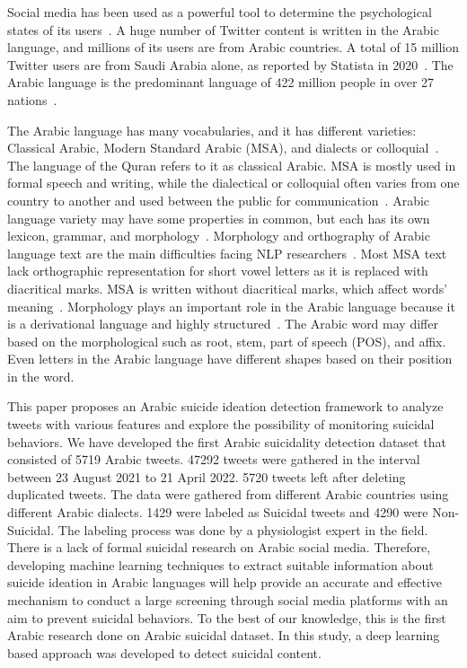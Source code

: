 \documentclass[11pt]{article}
\begin{document}
Social media has been used as a powerful tool to determine the psychological states of its users~\cite{15n10.1145/2858036.2858207}. A huge number of Twitter content is written in the Arabic language, and millions of its users are from Arabic countries. A total of 15 million Twitter users are from Saudi Arabia alone, as reported by Statista in 2020~\cite{16nhttps://doi.org/10.48550/arxiv.2004.04315}. The Arabic language is the predominant language of 422 million people in over 27 nations~\cite{17nBOUDAD20182479}.

The  Arabic language has many vocabularies, and it has different varieties: Classical Arabic, Modern Standard Arabic (MSA), and dialects or colloquial~\cite{17nBOUDAD20182479,18n10.1145/1644879.1644881}. The language of the Quran refers to it as classical Arabic. MSA is mostly used in formal speech and writing, while the dialectical or colloquial often varies from one country to another and used between the public for communication~\cite{17nBOUDAD20182479}. Arabic language variety may have some properties in common, but each has its own lexicon, grammar, and morphology~\cite{18n10.1145/1644879.1644881}. Morphology and orthography of Arabic language text are the main difficulties facing NLP researchers~\cite{17nBOUDAD20182479,19n7945623}. Most MSA text lack orthographic representation for short vowel letters as it is replaced with diacritical marks. MSA is written without diacritical marks, which affect words’ meaning~\cite{17nBOUDAD20182479,18n10.1145/1644879.1644881}. Morphology plays an important role in the Arabic language because it is a derivational language and highly structured~\cite{18n10.1145/1644879.1644881}. The Arabic word may differ based on the morphological such as root, stem, part of speech (POS), and affix\cite{17nBOUDAD20182479}. Even letters in the Arabic language have different shapes based on their position in the word\cite{18n10.1145/1644879.1644881}. 

This paper proposes an Arabic suicide ideation detection framework to analyze tweets with various features and explore the possibility of monitoring suicidal behaviors. We have developed the first Arabic suicidality detection dataset that consisted of 5719 Arabic tweets. 47292 tweets were gathered in the interval between 23 August 2021 to 21 April 2022. 5720 tweets left after deleting duplicated tweets.%
The data were gathered from different Arabic countries using different Arabic dialects. 1429 were labeled as Suicidal tweets and 4290 were Non-Suicidal. The labeling process was done by a physiologist expert in the field.
There is a lack of formal suicidal research on Arabic social media. Therefore, developing machine learning techniques to extract suitable information about suicide ideation in Arabic languages will help provide an accurate and effective mechanism to conduct a large screening through social media platforms with an aim to prevent suicidal behaviors. To the best of our knowledge, this is the first Arabic research done on Arabic suicidal dataset. In this study, a deep learning based approach was developed to detect suicidal content.
\end{document}
